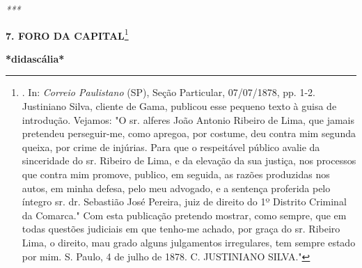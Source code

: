 \emph{***}

\protect\hypertarget{Secao_Sem_Titulo-11}{}{}\textbf{7. FORO DA
CAPITAL}\footnote{. In: \emph{Correio Paulistano} (SP), Seção
  Particular, 07/07/1878, pp. 1-2. Justiniano Silva, cliente de Gama,
  publicou esse pequeno texto à guisa de introdução. Vejamos: "O sr.
  alferes João Antonio Ribeiro de Lima, que jamais pretendeu
  perseguir-me, como apregoa, por costume, deu contra mim segunda
  queixa, por crime de injúrias. Para que o respeitável público avalie
  da sinceridade do sr. Ribeiro de Lima, e da elevação da sua justiça,
  nos processos que contra mim promove, publico, em seguida, as razões
  produzidas nos autos, em minha defesa, pelo meu advogado, e a sentença
  proferida pelo íntegro sr. dr. Sebastião José Pereira, juiz de direito
  do 1º Distrito Criminal da Comarca." Com esta publicação pretendo
  mostrar, como sempre, que em todas questões judiciais em que tenho-me
  achado, por graça do sr. Ribeiro Lima, o direito, mau grado alguns
  julgamentos irregulares, tem sempre estado por mim. S. Paulo, 4 de
  julho de 1878. C. JUSTINIANO SILVA."}

\textbf{*didascália*}


